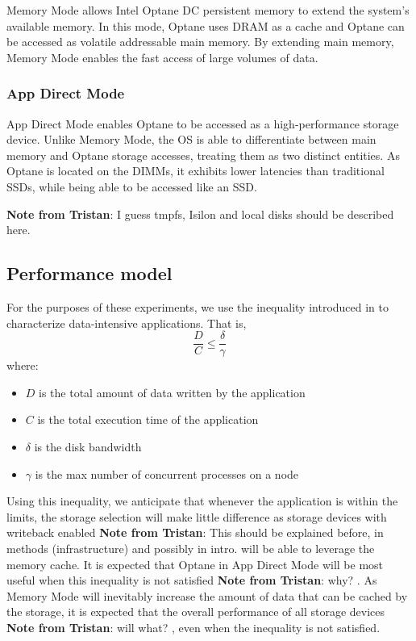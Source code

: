 \documentclass[conference]{IEEEtran}
\newcommand{\tristan}[1]{\color{orange}\textbf{Note from Tristan}:
      #1 \color{black}}
\begin{document}
Memory Mode allows Intel Optane DC persistent memory to extend the system's available
memory. In this mode, Optane uses DRAM as a cache and Optane can be accessed as
volatile addressable main memory. By extending main memory, Memory Mode enables the
fast access of large volumes of data.

\subsubsection{App Direct Mode}

App Direct Mode enables Optane to be accessed as a high-performance storage device.
Unlike Memory Mode, the OS is able to differentiate between main memory and Optane
storage accesses, treating them as two distinct entities. As Optane is located on
the DIMMs, it exhibits lower latencies than traditional SSDs, while being able
to be accessed like an SSD.

\tristan{I guess tmpfs, Isilon and local disks should be described here.}

\subsection{Performance model}

For the purposes of these experiments, we use the inequality introduced in
\cite{paperinmem} to characterize data-intensive applications. That is,
\begin{equation}                                                                 
\frac{D}{C} \leq \frac{\delta}{\gamma} \label{eq:page-cache-inequality}                                                                                                                                  
\end{equation} 
where:
\begin{itemize}
    \item $D$ is the total amount of data written by the application
    \item $C$ is the total execution time of the application
    \item $\delta$ is the disk bandwidth
    \item $\gamma$ is the max number of concurrent processes on a node
\end{itemize}

Using this inequality, we anticipate that whenever the application is within the limits,
the storage selection will make little difference as storage devices with writeback enabled \tristan{This should be explained 
before, in methods (infrastructure) and possibly in intro.}
will be able to leverage the memory cache. It is expected that Optane in App Direct Mode
will be most useful when this inequality is not satisfied \tristan{why?}. As Memory Mode will inevitably
increase the amount of data that can be cached by the storage, it is expected that the overall
performance of all storage devices \tristan{will what?}, even when the inequality is not satisfied.
\end{document}
